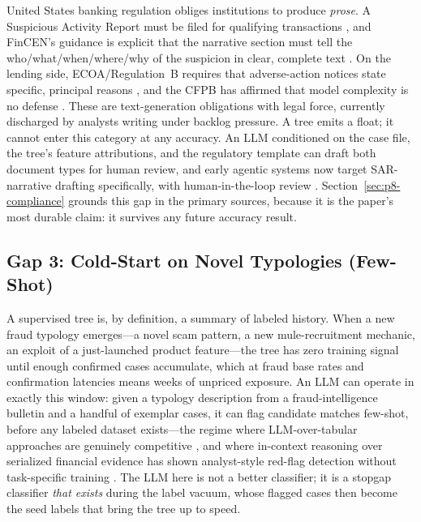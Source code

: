 \documentclass{article}
\providecommand{\secref}[1]{Section~\ref{#1}}
\begin{document}
United States banking regulation obliges institutions to produce
\emph{prose}. A Suspicious Activity Report must be filed for qualifying
transactions \citep{cfr1020_320}, and FinCEN's guidance is explicit that the
narrative section must tell the who/what/when/where/why of the suspicion in
clear, complete text \citep{fincen2003sarnarrative}. On the lending side,
ECOA/Regulation~B requires that adverse-action notices state specific,
principal reasons \citep{cfr1002_9}, and the CFPB has affirmed that model
complexity is no defense \citep{cfpb2022circular}. These are text-generation
obligations with legal force, currently discharged by analysts writing under
backlog pressure. A tree emits a float; it cannot enter this category at any
accuracy. An LLM conditioned on the case file, the tree's feature attributions,
and the regulatory template can draft both document types for human review,
and early agentic systems now target SAR-narrative drafting specifically, with
human-in-the-loop review \citep{naik2025coinvestigator}.
\secref{sec:p8-compliance} grounds this gap in the primary sources, because it
is the paper's most durable claim: it survives any future accuracy result.

\subsection{Gap 3: Cold-Start on Novel Typologies (Few-Shot)}
\label{sec:p8-gap-coldstart}

A supervised tree is, by definition, a summary of labeled history. When a new
fraud typology emerges---a novel scam pattern, a new mule-recruitment
mechanic, an exploit of a just-launched product feature---the tree has zero
training signal until enough confirmed cases accumulate, which at fraud base
rates and confirmation latencies \citep{dalpozzolo2018realistic} means weeks
of unpriced exposure. An LLM can operate in exactly this window: given a
typology description from a fraud-intelligence bulletin and a handful of
exemplar cases, it can flag candidate matches few-shot, before any labeled
dataset exists---the regime where LLM-over-tabular approaches are genuinely
competitive \citep{hegselmann2023tabllm}, and where in-context reasoning over
serialized financial evidence has shown analyst-style red-flag detection
without task-specific training \citep{pirmorad2025icl_aml}. The LLM here is
not a better classifier; it is a stopgap classifier \emph{that exists} during
the label vacuum, whose flagged cases then become the seed labels that bring
the tree up to speed.
\end{document}
